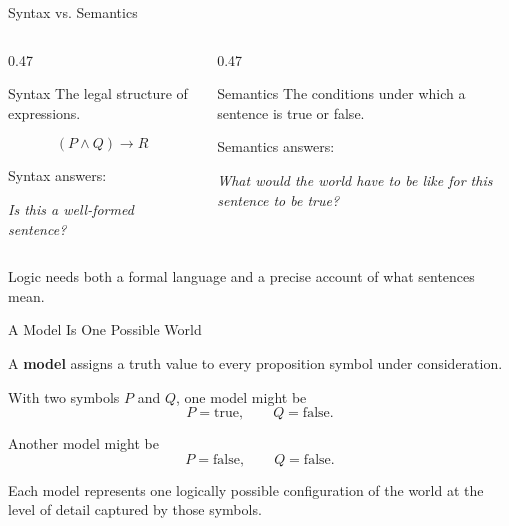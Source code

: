 \documentclass[aspectratio=169,10pt]{beamer}
\begin{document}
\begin{frame}[shrink=10]{Syntax vs. Semantics}
  \begin{columns}[T,onlytextwidth]
    \begin{column}{0.47\textwidth}
      \begin{block}{Syntax}
        The legal structure of expressions.

        \[
          (P\land Q)\rightarrow R
        \]

        Syntax answers:
        \begin{center}
          \textit{Is this a well-formed sentence?}
        \end{center}
      \end{block}
    \end{column}
    \begin{column}{0.47\textwidth}
      \begin{block}{Semantics}
        The conditions under which a sentence is true or false.

        Semantics answers:
        \begin{center}
          \textit{What would the world have to be like for this sentence to be true?}
        \end{center}
      \end{block}
    \end{column}
  \end{columns}

  \begin{keyidea}
    Logic needs both a formal language and a precise account of what sentences mean.
  \end{keyidea}
\end{frame}

\begin{frame}[shrink=10]{A Model Is One Possible World}
  \begin{cpdefinition}
    A \textbf{model} assigns a truth value to every proposition symbol under consideration.
  \end{cpdefinition}

  With two symbols \(P\) and \(Q\), one model might be
  \[
    P=\mathrm{true},\qquad Q=\mathrm{false}.
  \]

  Another model might be
  \[
    P=\mathrm{false},\qquad Q=\mathrm{false}.
  \]

  Each model represents one logically possible configuration of the world at the level of detail captured by those symbols.
\end{frame}
\end{document}
